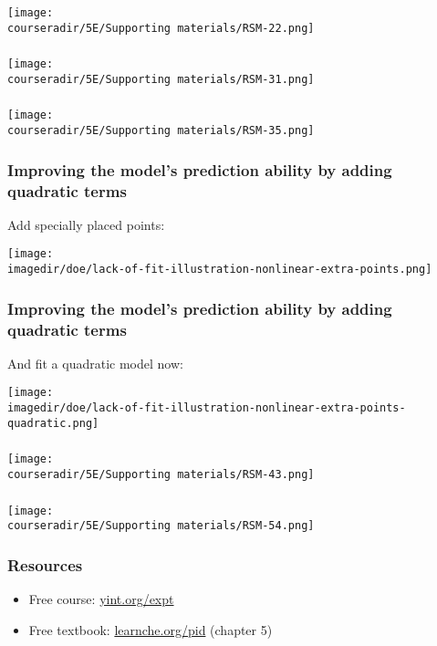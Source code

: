 \documentclass[11pt,aspectratio=169,mathserif]{beamer}
\begin{document}
\begin{frame}\frametitle{}
	\centerline{\texttt{[image: \\courseradir/5E/Supporting materials/RSM-22.png]}}
\end{frame}
\begin{frame}\frametitle{}
	\centerline{\texttt{[image: \\courseradir/5E/Supporting materials/RSM-31.png]}}
\end{frame}
\begin{frame}\frametitle{}
	\centerline{\texttt{[image: \\courseradir/5E/Supporting materials/RSM-35.png]}}
\end{frame}
\begin{frame}\frametitle{Improving the model's prediction ability by adding quadratic terms}
	Add specially placed points:
	
	\centerline{\texttt{[image: \\imagedir/doe/lack-of-fit-illustration-nonlinear-extra-points.png]}}
\end{frame}
\begin{frame}\frametitle{Improving the model's prediction ability by adding quadratic terms}
	And fit a quadratic model now:
	
	\centerline{\texttt{[image: \\imagedir/doe/lack-of-fit-illustration-nonlinear-extra-points-quadratic.png]}}
\end{frame}
\begin{frame}\frametitle{}
	\centerline{\texttt{[image: \\courseradir/5E/Supporting materials/RSM-43.png]}}
\end{frame}
\begin{frame}\frametitle{}
	\centerline{\texttt{[image: \\courseradir/5E/Supporting materials/RSM-54.png]}}
\end{frame}

\begin{frame}\frametitle{Resources}
	
	\begin{exampleblock}{}
		\LARGE  
		\begin{itemize}
			\item	Free course: \href{http://yint.org/expt}{yint.org/expt}
			\item	Free textbook: \href{https://learnche.org/pid/design-analysis-experiments/index}{learnche.org/pid} (chapter 5)
		\end{itemize}
	\end{exampleblock}	
\end{frame}
\end{document}
